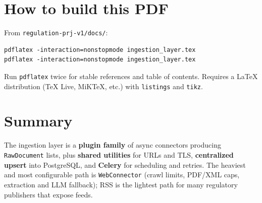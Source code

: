 \documentclass[11pt,a4paper]{article}
\begin{document}
\section{How to build this PDF}

From \texttt{regulation-prj-v1/docs/}:
\begin{verbatim}
pdflatex -interaction=nonstopmode ingestion_layer.tex
pdflatex -interaction=nonstopmode ingestion_layer.tex
\end{verbatim}
Run \texttt{pdflatex} twice for stable references and table of contents.
Requires a LaTeX distribution (TeX Live, MiKTeX, etc.) with \texttt{listings} and \texttt{tikz}.

\section{Summary}

The ingestion layer is a \textbf{plugin family} of async connectors producing
\texttt{RawDocument} lists, plus \textbf{shared utilities} for URLs and TLS,
\textbf{centralized upsert} into PostgreSQL, and \textbf{Celery} for scheduling and
retries. The heaviest and most configurable path is \texttt{WebConnector} (crawl
limits, PDF/XML caps, extraction and LLM fallback); RSS is the lightest path for
many regulatory publishers that expose feeds.
\end{document}
